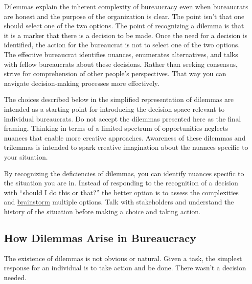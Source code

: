 Dilemmas explain the inherent complexity of bureaucracy even when bureaucrats are honest and the purpose of the organization is clear.
The point isn't that one should \href{https://en.wikipedia.org/wiki/False_dilemma}{select one of the two options}. 
\iftoggle{WPinmargin}{\marginpar{[Wikipedia] False\\dilemma}}{}
The point of recognizing a dilemma is that it is a marker that there is a decision to be made.
Once the need for a decision is identified, the action for the bureaucrat is not to select one of the two options. The effective bureaucrat identifies nuances, enumerates alternatives, and talks with fellow bureaucrats about these decisions. Rather than seeking consensus, strive for comprehension of other people's perspectives. That way you can navigate decision-making processes more effectively.

The choices described below in the simplified representation of dilemmas are intended as a starting point for introducing the decision space relevant to individual bureaucrats. Do not accept the dilemmas presented here as the final framing. Thinking in terms of a limited spectrum of opportunities neglects nuances that enable more creative approaches. 
Awareness of these dilemmas and trilemmas is intended to spark creative imagination about the nuances specific to your situation.

By recognizing the deficiencies of dilemmas, you can identify nuances specific to the situation you are in. Instead of responding to the recognition of a decision with ``should I do this or that?'' the better option is to assess the complexities and \href{https://en.wikipedia.org/wiki/Brainstorming}{brainstorm}
\iftoggle{WPinmargin}{\marginpar{[Wikipedia] Brainstorming}}{}
multiple options. Talk with stakeholders and understand the history of the situation before making a choice and taking action.



\subsection*{How Dilemmas Arise in Bureaucracy}

The existence of dilemmas is not obvious or natural. 
Given a task, the simplest response for an individual is to take action and be done. 
There wasn't a decision needed.

